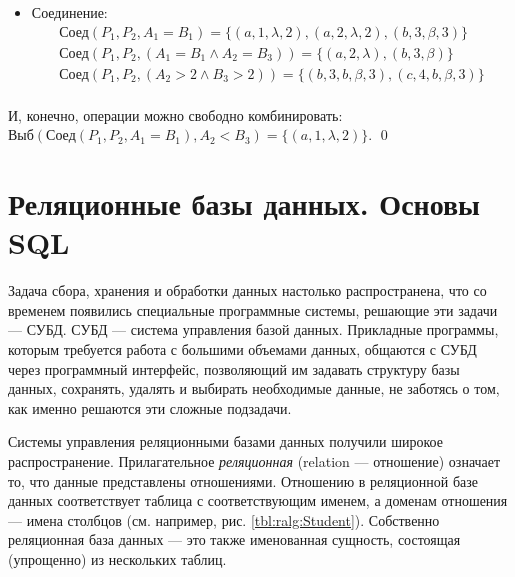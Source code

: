 \begin{exampl}
\begin{itemize}
        \item Соединение:
        \[
            \begin{split}
                \text{Соед}(P_1,P_2,A_1=B_1)=\{
                    (a,1,\lambda,2),
                    (a,2,\lambda,2),
                    (b,3,\beta,3)                     
                \}\\
                \text{Соед}(P_1,P_2,(A_1=B_1\land A_2=B_3))=\{
                    (a,2,\lambda),
                    (b,3,\beta)                     
                \}\\
                \text{Соед}(P_1,P_2,(A_2>2\land B_3>2))=\{
                    (b,3,b,\beta,3),(c,4,b,\beta,3)
                \}\\
            \end{split}
        \]        
    \end{itemize}
    И, конечно, операции можно свободно комбинировать: $\text{Выб}(\text{Соед}(P_1,P_2,A_1=B_1), A_2<B_3)=\{(a,1,\lambda,2)\}$.
    \qed
\end{exampl}


\section{Реляционные базы данных. Основы SQL}

Задача сбора, хранения и обработки данных настолько распространена, что со временем появились специальные программные системы, решающие эти задачи --- СУБД. СУБД --- система управления базой данных. Прикладные программы, которым требуется работа с большими объемами данных, общаются с СУБД через программный интерфейс, позволяющий им задавать структуру базы данных, сохранять, удалять и выбирать необходимые данные, не заботясь о том, как именно решаются эти сложные подзадачи. 

Системы управления реляционными базами данных получили широкое распространение. Прилагательное \emph{реляционная} (relation --- отношение) означает то, что данные представлены отношениями. Отношению в реляционной базе данных соответствует таблица с соответствующим именем, а доменам отношения --- имена столбцов (см. например, рис. \ref{tbl:ralg:Student}). Собственно реляционная база данных --- это также именованная сущность, состоящая (упрощенно) из нескольких таблиц.


